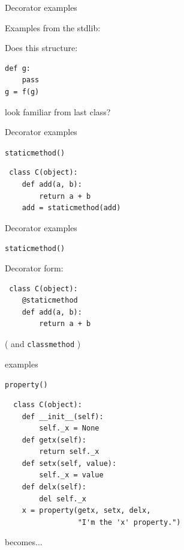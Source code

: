 \documentclass{beamer}
\begin{document}
\begin{frame}[fragile]{Decorator  examples}

{\LARGE Examples from the stdlib:}

\vfill
{\Large Does this structure:}

\vfill
\begin{verbatim}
def g:
    pass
g = f(g)
\end{verbatim}

\vfill

{\Large look familiar from last class?}
\end{frame} 

\begin{frame}[fragile]{Decorator examples}

{\LARGE \verb|staticmethod()|}

\vfill
\begin{verbatim}
￼class C(object):
    def add(a, b):
        return a + b
    add = staticmethod(add)
\end{verbatim}

\vfill

\end{frame} 

\begin{frame}[fragile]{Decorator examples}

{\LARGE \verb|staticmethod()|}

\vfill
{\Large Decorator form:}
\begin{verbatim}
￼class C(object):
    @staticmethod
    def add(a, b):
        return a + b
\end{verbatim}

\vfill

{\LARGE ( and \verb|classmethod| )}
\end{frame} 

\begin{frame}[fragile]{examples}

{\LARGE \verb|property()|}

\vfill
\begin{verbatim}
￼￼class C(object):
    def __init__(self):
        self._x = None
    def getx(self):
        return self._x
    def setx(self, value):
        self._x = value
    def delx(self):
        del self._x
    x = property(getx, setx, delx,
                 "I'm the 'x' property.")
\end{verbatim}

\vfill
becomes...
\end{frame} 
\end{document}
